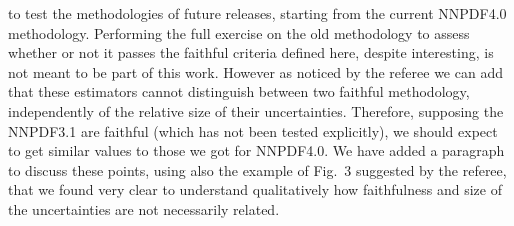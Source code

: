 \documentclass[11pt,a4paper]{article}
\numberwithin{equation}{section}
\numberwithin{figure}{section}
\numberwithin{table}{section}
\begin{document}
\begin{enumerate}
    to test the methodologies of future releases, starting from the current NNPDF4.0 methodology.
    Performing the full exercise on the old methodology to assess whether or not it passes the faithful
    criteria defined here, despite interesting, is not meant to be part of this work.
    However as noticed by the referee we can add that these estimators cannot distinguish 
    between two faithful methodology, independently of the relative size of their uncertainties.
    Therefore, supposing the NNPDF3.1 are faithful (which has not been tested explicitly),
    we should expect to get similar values to those we got for NNPDF4.0.
    We have added a paragraph to discuss these points, using also the example of Fig.~3 suggested by the referee,
    that we found very clear to understand qualitatively how faithfulness and size of the uncertainties are 
    not necessarily related. 



\end{enumerate}
\end{document}

